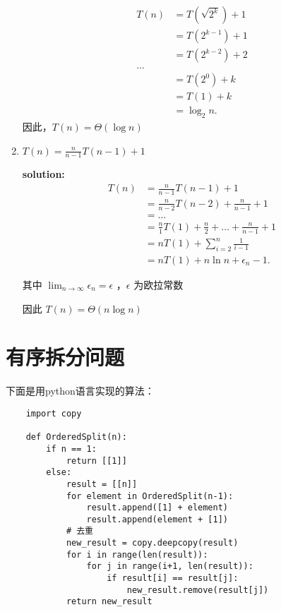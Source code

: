 \documentclass[UTF8]{ctexart}
\begin{document}
\begin{enumerate}
        \begin{align*}
            T\left( n \right) &= T\left( \sqrt{2^{k}}  \right)  + 1  \\
            &= T\left( 2^{k-1}  \right) + 1 \\
            &= T\left( 2^{k-2}  \right) + 2 \\
            \ldots \\
            &= T\left( 2^{0}  \right) + k \\
            &= T \left( 1\right)  + k \\
            &= \log_{2} n
        .\end{align*}
        因此，$ T\left(n  \right)  = \Theta\left( \log n \right)  $
    \item $ T\left( n \right) = \frac{n}{n-1} T\left( n-1 \right)  + 1 $

        \textbf{solution:}
            \begin{align*}
                    T\left( n \right)  &=  \frac{n}{n-1} T \left( n-1 \right)  + 1 \\
                &= \frac{n}{n-2} T\left( n-2 \right) + \frac{n}{n-1} + 1 \\
                &= \ldots \\
                &= \frac{n}{1} T\left(1  \right)  + \frac{n}{2} + \ldots + \frac{n}{n-1} + 1 \\
                &=  n T\left( 1 \right)  + \sum_{i=2}^{n} \frac{1}{i-1} \\
                &= n T\left( 1 \right)  + n \ln n  + \epsilon_n - 1
            .\end{align*}

    其中 $ \lim_{n \to \infty} \epsilon_n = \epsilon  $  ，$ \epsilon $ 为欧拉常数 

    因此 $ T\left( n \right)  = \Theta\left(  n \log n\right) $
\end{enumerate}

\section{有序拆分问题}%
\label{sec:有序拆分问题}

下面是用python语言实现的算法：

    \begin{verbatim}
    import copy

    def OrderedSplit(n):
        if n == 1:
            return [[1]]
        else:
            result = [[n]]
            for element in OrderedSplit(n-1):
                result.append([1] + element)
                result.append(element + [1])
            # 去重
            new_result = copy.deepcopy(result)
            for i in range(len(result)):
                for j in range(i+1, len(result)):
                    if result[i] == result[j]:
                        new_result.remove(result[j])
            return new_result
    \end{verbatim}
\end{document}
